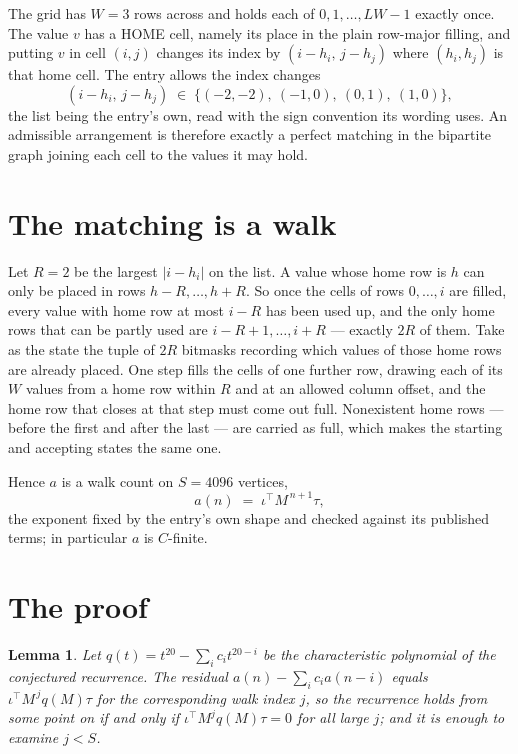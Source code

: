 \documentclass[11pt,a4paper]{article}
\theoremstyle{plain}
\newtheorem{lemma}[theorem]{Lemma}
\theoremstyle{definition}
\begin{document}
The grid has $W=3$ rows across and holds each of $0,1,\dots,LW-1$ exactly once. The value
$v$ has a HOME cell, namely its place in the plain row-major filling, and putting $v$ in cell
$(i,j)$ changes its index by $(i-h_i,\,j-h_j)$ where $(h_i,h_j)$ is that home cell. The entry
allows the index changes
\[
(i-h_i,\,j-h_j)\;\in\;\{(-2,-2),\ (-1,0),\ (0,1),\ (1,0)\},
\]
the list being the entry's own, read with the sign convention its wording uses. An admissible
arrangement is therefore exactly a perfect matching in the bipartite graph joining each cell to
the values it may hold.

\section{The matching is a walk}

Let $R=2$ be the largest $|i-h_i|$ on the list. A value whose home row is $h$ can only be
placed in rows $h-R,\dots,h+R$. So once the cells of rows $0,\dots,i$ are filled, every
value with home row at most $i-R$ has been used up, and the only home rows that can be
partly used are $i-R+1,\dots,i+R$ --- exactly $2R$ of them. Take as the state the tuple of
$2R$ bitmasks recording which values of those home rows are already placed. One step fills
the cells of one further row, drawing each of its $W$ values from a home row within $R$
and at an allowed column offset, and the home row that closes at that step must come out
full. Nonexistent home rows --- before the first and after the last --- are carried as
full, which makes the starting and accepting states the same one.

Hence $a$ is a walk count on $S=4096$ vertices,
\[
a(n)\;=\;\iota^{\!\top}M^{\,n+1}\tau ,
\]
the exponent fixed by the entry's own shape and checked against its published terms; in
particular $a$ is $C$-finite.

\section{The proof}

\begin{lemma}\label{lem:crit}
Let $q(t)=t^{20}-\sum_i c_it^{20-i}$ be the characteristic polynomial of the
conjectured recurrence. The residual $a(n)-\sum_ic_ia(n-i)$ equals
$\iota^{\!\top}M^{\,j}q(M)\tau$ for the corresponding walk index $j$, so the recurrence
holds from some point on if and only if $\iota^{\!\top}M^{j}q(M)\tau=0$ for all large $j$;
and it is enough to examine $j<S$.
\end{lemma}
\end{document}
